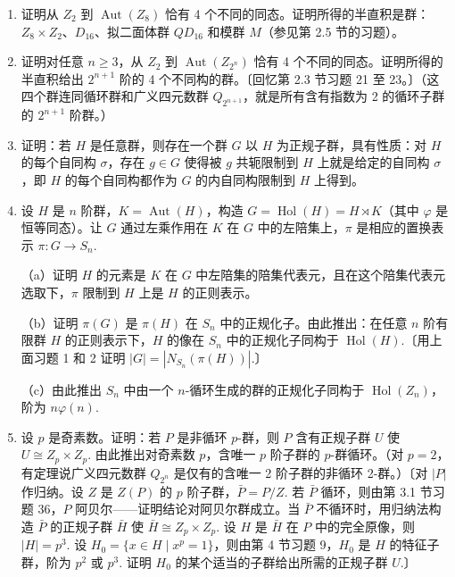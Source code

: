 \begin{enumerate}
\item 证明从 \(Z_2\) 到 \(\operatorname{Aut}(Z_8)\) 恰有 4 个不同的同态。证明所得的半直积是群：\(Z_8 \times Z_2\)、\(D_{16}\)、拟二面体群 \(QD_{16}\) 和模群 \(M\)（参见第 2.5 节的习题）。

\item 证明对任意 \(n \geq 3\)，从 \(Z_2\) 到 \(\operatorname{Aut}(Z_{2^n})\) 恰有 4 个不同的同态。证明所得的半直积给出 \(2^{n+1}\) 阶的 4 个不同构的群。〔回忆第 2.3 节习题 21 至 23。〕（这四个群连同循环群和广义四元数群 \(Q_{2^{n+1}}\)，就是所有含有指数为 2 的循环子群的 \(2^{n+1}\) 阶群。）

\item 证明：若 \(H\) 是任意群，则存在一个群 \(G\) 以 \(H\) 为正规子群，具有性质：对 \(H\) 的每个自同构 \(\sigma\)，存在 \(g \in G\) 使得被 \(g\) 共轭限制到 \(H\) 上就是给定的自同构 \(\sigma\)，即 \(H\) 的每个自同构都作为 \(G\) 的内自同构限制到 \(H\) 上得到。

\item 设 \(H\) 是 \(n\) 阶群，\(K = \operatorname{Aut}(H)\)，构造 \(G = \operatorname{Hol}(H) = H \rtimes K\)（其中 \(\varphi\) 是恒等同态）。让 \(G\) 通过左乘作用在 \(K\) 在 \(G\) 中的左陪集上，\(\pi\) 是相应的置换表示 \(\pi : G \to S_n\).

（a）证明 \(H\) 的元素是 \(K\) 在 \(G\) 中左陪集的陪集代表元，且在这个陪集代表元选取下，\(\pi\) 限制到 \(H\) 上是 \(H\) 的正则表示。

（b）证明 \(\pi(G)\) 是 \(\pi(H)\) 在 \(S_n\) 中的正规化子。由此推出：在任意 \(n\) 阶有限群 \(H\) 的正则表示下，\(H\) 的像在 \(S_n\) 中的正规化子同构于 \(\operatorname{Hol}(H)\).〔用上面习题 1 和 2 证明 \(|G| = |N_{S_n}(\pi(H))|\).〕

（c）由此推出 \(S_n\) 中由一个 \(n\)-循环生成的群的正规化子同构于 \(\operatorname{Hol}(Z_n)\)，阶为 \(n\varphi(n)\).

\item 设 \(p\) 是奇素数。证明：若 \(P\) 是非循环 \(p\)-群，则 \(P\) 含有正规子群 \(U\) 使 \(U \cong Z_p \times Z_p\). 由此推出对奇素数 \(p\)，含唯一 \(p\) 阶子群的 \(p\)-群循环。（对 \(p = 2\)，有定理说广义四元数群 \(Q_{2^n}\) 是仅有的含唯一 2 阶子群的非循环 2-群。）〔对 \(|P|\) 作归纳。设 \(Z\) 是 \(Z(P)\) 的 \(p\) 阶子群，\(\bar{P} = P/Z\). 若 \(\bar{P}\) 循环，则由第 3.1 节习题 36，\(P\) 阿贝尔——证明结论对阿贝尔群成立。当 \(\bar{P}\) 不循环时，用归纳法构造 \(\bar{P}\) 的正规子群 \(\bar{H}\) 使 \(\bar{H} \cong Z_p \times Z_p\). 设 \(H\) 是 \(\bar{H}\) 在 \(P\) 中的完全原像，则 \(|H| = p^3\). 设 \(H_0 = \{x \in H \mid x^p = 1\}\)，则由第 4 节习题 9，\(H_0\) 是 \(H\) 的特征子群，阶为 \(p^2\) 或 \(p^3\). 证明 \(H_0\) 的某个适当的子群给出所需的正规子群 \(U\).〕


\end{enumerate}
